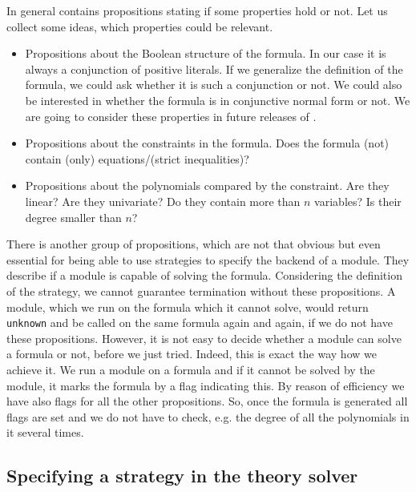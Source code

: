 In general \prop contains propositions stating if some properties hold or not. Let 
us collect some ideas, which properties could be relevant.
\begin{itemize}
	\item Propositions about the Boolean structure of the formula. In our case it is
		always a conjunction of positive literals. If we generalize the definition of
		the formula, we could ask whether it is such a conjunction or not. We could
		also be interested in whether the formula is in conjunctive normal form or not.
		We are going to consider these properties in future releases of \smtrat.
	\item Propositions about the constraints in the formula. Does the formula (not) contain
		(only) equations/(strict inequalities)? 
	\item Propositions about the polynomials compared by the constraint. Are they linear?
		Are they univariate? Do they contain more than $n$ variables? Is their degree smaller 
		than $n$?
\end{itemize}
There is another group of propositions, which are not that obvious but even essential for being 
able to use strategies to specify the backend of a module. They describe if a module is capable
of solving the formula. Considering the definition of the strategy, we cannot guarantee termination
without these propositions. A module, which we run on the formula which it cannot solve, would return
\texttt{unknown} and be called on the same formula again and again, if we do not have these propositions.
However, it is not easy to decide whether a module can solve a formula or
not, before we just tried. Indeed, this is exact the way how we achieve it. We run a module
on a formula and if it cannot be solved by the module, it marks the formula by a flag indicating this. 
By reason of efficiency we have also flags for all the other propositions.
So, once the formula is generated all flags are set and we do not have to check, e.g. the 
degree of all the polynomials in it several times.

\subsection{Specifying a strategy in the theory solver}

